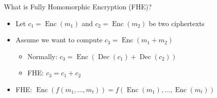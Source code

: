 \documentclass[aspectratio=169]{beamer}
\begin{document}
\begin{frame}{What is Fully Homomorphic Encryption (FHE)?}

    \begin{itemize}
        \item Let $c_1= \operatorname{Enc}(m_1)$ and $c_2= \operatorname{Enc}(m_2)$ be two ciphertexts
    \end{itemize}

    \begin{itemize}
        \item Assume we want to compute $c_3 = \operatorname{Enc}(m_1 + m_2)$
        \begin{itemize}
            \item Normally: $c_3 = \operatorname{Enc}(\operatorname{Dec}(c_1) + \operatorname{Dec}(c_2))$
            \item FHE: $c_3 = c_1 + c_2$
        \end{itemize}
    \end{itemize}

    \begin{itemize}
        \item FHE: \; $\operatorname{Enc}(f(m_1, \dots, m_t)) = f(\operatorname{Enc}(m_1), \dots, \operatorname{Enc}(m_t))$
    \end{itemize}
\end{frame}
\end{document}
